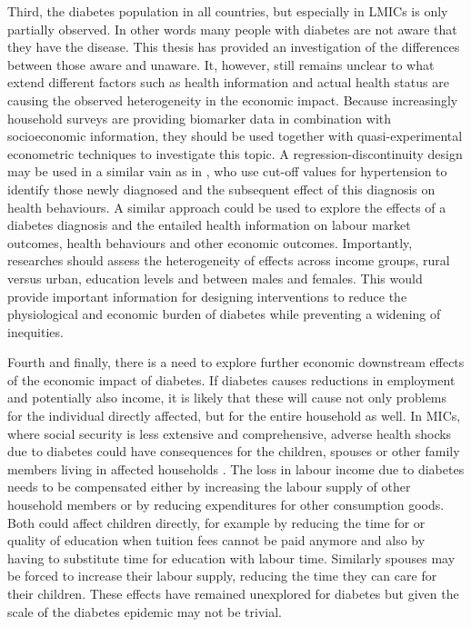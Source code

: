 Third, the diabetes population in all countries, but especially in \acp{LMIC} is only partially observed. In other words many people with diabetes are not aware that they have the disease. This thesis has provided an investigation of the differences between those aware and unaware. It, however, still remains unclear to what extend different factors such as health information and actual health status are causing the observed heterogeneity in the economic impact. Because increasingly household surveys are providing biomarker data in combination with socioeconomic information, they should be used together with quasi-experimental econometric techniques to investigate this topic. A regression-discontinuity design may be used in a similar vain as in \textcite{Zhao2013a}, who use cut-off values for hypertension to identify those newly diagnosed and the subsequent effect of this diagnosis on health behaviours. A similar approach could be used to explore the effects of a diabetes diagnosis and the entailed health information on labour market outcomes, health behaviours and other economic outcomes. Importantly, researches should assess the heterogeneity of effects across income groups, rural versus urban, education levels and between males and females. This would provide important information for designing interventions to reduce the physiological and economic burden of diabetes while preventing a widening of inequities.

Fourth and finally, there is a need to explore further economic downstream effects of the economic impact of diabetes. If diabetes causes reductions in employment and potentially also income, it is likely that these will cause not only problems for the individual directly affected, but for the entire household as well. In \acp{MIC}, where social security is less extensive and comprehensive, adverse health shocks due to diabetes could have consequences for the children, spouses or other family members living in affected households \parencite{Alam2014}. The loss in labour income due to diabetes needs to be compensated either by increasing the labour supply of other household members or by reducing expenditures for other consumption goods. Both could affect children directly, for example by reducing the time for or quality of education when tuition fees cannot be paid anymore and also by having to substitute time for education with labour time. Similarly spouses may be forced to increase their labour supply, reducing the time they can care for their children. These effects have remained unexplored for diabetes but given the scale of the diabetes epidemic may not be trivial.



